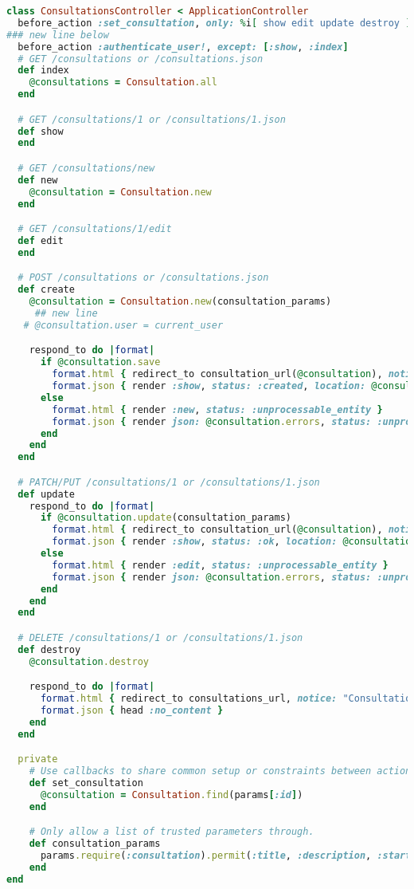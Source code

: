 \begin{lstlisting}[language=Ruby, caption=Ruby Controller]
class ConsultationsController < ApplicationController
  before_action :set_consultation, only: %i[ show edit update destroy ]
### new line below
  before_action :authenticate_user!, except: [:show, :index]
  # GET /consultations or /consultations.json
  def index
    @consultations = Consultation.all
  end

  # GET /consultations/1 or /consultations/1.json
  def show
  end

  # GET /consultations/new
  def new
    @consultation = Consultation.new
  end

  # GET /consultations/1/edit
  def edit
  end

  # POST /consultations or /consultations.json
  def create
    @consultation = Consultation.new(consultation_params)
     ## new line
   # @consultation.user = current_user

    respond_to do |format|
      if @consultation.save
        format.html { redirect_to consultation_url(@consultation), notice: "Consultation was successfully created." }
        format.json { render :show, status: :created, location: @consultation }
      else
        format.html { render :new, status: :unprocessable_entity }
        format.json { render json: @consultation.errors, status: :unprocessable_entity }
      end
    end
  end

  # PATCH/PUT /consultations/1 or /consultations/1.json
  def update
    respond_to do |format|
      if @consultation.update(consultation_params)
        format.html { redirect_to consultation_url(@consultation), notice: "Consultation was successfully updated." }
        format.json { render :show, status: :ok, location: @consultation }
      else
        format.html { render :edit, status: :unprocessable_entity }
        format.json { render json: @consultation.errors, status: :unprocessable_entity }
      end
    end
  end

  # DELETE /consultations/1 or /consultations/1.json
  def destroy
    @consultation.destroy

    respond_to do |format|
      format.html { redirect_to consultations_url, notice: "Consultation was successfully destroyed." }
      format.json { head :no_content }
    end
  end

  private
    # Use callbacks to share common setup or constraints between actions.
    def set_consultation
      @consultation = Consultation.find(params[:id])
    end

    # Only allow a list of trusted parameters through.
    def consultation_params
      params.require(:consultation).permit(:title, :description, :start_time, :end_time)
    end
end



\end{lstlisting}

